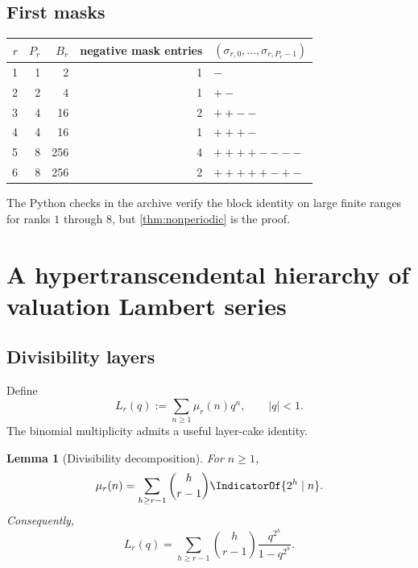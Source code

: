 \documentclass[11pt,oneside]{article}
\newtheorem{lemma}[theorem]{Lemma}
\theoremstyle{definition}
\theoremstyle{remark}
\begin{document}
\subsection{First masks}

\begin{center}
\begin{tabular}{@{}rrrrl@{}}
\toprule
$r$ & $P_r$ & $B_r$ & negative mask entries & $(\sigma_{r,0},\ldots,\sigma_{r,P_r-1})$\\
\midrule
1 & 1 & 2 & 1 & $-$\\
2 & 2 & 4 & 1 & $+-$\\
3 & 4 & 16 & 2 & $++--$\\
4 & 4 & 16 & 1 & $+++- $\\
5 & 8 & 256 & 4 & $++++----$\\
6 & 8 & 256 & 2 & $+++++-+-$\\
\bottomrule
\end{tabular}
\end{center}

The Python checks in the archive verify the block identity on large finite
ranges for ranks $1$ through $8$, but \cref{thm:nonperiodic} is the proof.

\section{A hypertranscendental hierarchy of valuation Lambert series}

\subsection{Divisibility layers}

Define
\begin{equation}\label{eq:L-def}
 L_r(q):=\sum_{n\geq1}\mu_r(n)q^n,
 \qquad |q|<1.
\end{equation}
The binomial multiplicity admits a useful layer-cake identity.

\begin{lemma}[Divisibility decomposition]\label{lem:mu-layer}
For $n\geq1$,
\begin{equation}\label{eq:mu-layer}
 \mu_r(n)=\sum_{h\geq r-1}\binom h{r-1}\IndicatorOf{2^h\mid n}.
\end{equation}
Consequently,
\begin{equation}\label{eq:L-layer}
 \boxed{
 L_r(q)=\sum_{h\geq r-1}\binom h{r-1}
 \frac{q^{2^h}}{1-q^{2^h}}.}
\end{equation}
\end{lemma}
\end{document}
